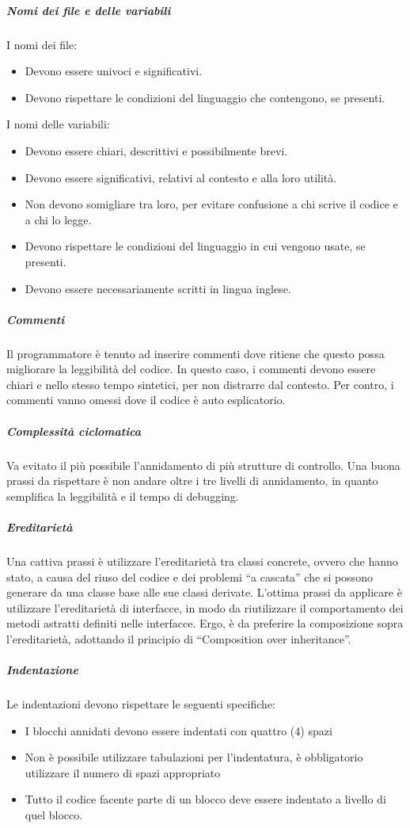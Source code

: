 \documentclass[../../norme-di-progetto.tex]{subfiles}
\begin{document}
\subparagraph{Nomi dei file e delle variabili}%
\label{subp:nomi_file_e_variabili}
I nomi dei file:
\begin{itemize}
    \item Devono essere univoci e significativi.
    \item Devono rispettare le condizioni del linguaggio che contengono, se presenti.
\end{itemize}
I nomi delle variabili:
\begin{itemize}
    \item Devono essere chiari, descrittivi e possibilmente brevi.
    \item Devono essere significativi, relativi al contesto e alla loro utilità.
    \item Non devono somigliare tra loro, per evitare confusione a chi scrive il codice e a chi lo legge.
    \item Devono rispettare le condizioni del linguaggio in cui vengono usate, se presenti.
    \item Devono essere necessariamente scritti in lingua inglese.
\end{itemize}

\subparagraph{Commenti}%
\label{subp:commenti}
Il programmatore è tenuto ad inserire commenti dove ritiene che questo possa migliorare la leggibilità del codice.
In questo caso, i commenti devono essere chiari e nello stesso tempo sintetici, per non distrarre dal contesto.
Per contro, i commenti vanno omessi dove il codice è auto esplicatorio.

\subparagraph{Complessità ciclomatica}%
\label{subp:complessita_ciclomatica}
Va evitato il più possibile l’annidamento di più strutture di controllo.
Una buona prassi da rispettare è non andare oltre i tre livelli di annidamento, in quanto semplifica la leggibilità e il tempo di debugging.

\subparagraph{Ereditarietà}%
\label{subp:ereditarieta}
Una cattiva prassi è utilizzare l’ereditarietà tra classi concrete, ovvero che hanno stato, a causa del riuso del codice e dei problemi ``a cascata'' che si possono generare da una classe base alle sue classi derivate.
L'ottima prassi da applicare è utilizzare l'ereditarietà di interfacce, in modo da riutilizzare il comportamento dei metodi astratti definiti nelle interfacce.
Ergo, è da preferire la composizione sopra l'ereditarietà, adottando il principio di “Composition over inheritance”.

\subparagraph{Indentazione}%
\label{subp:indentazione}
Le indentazioni devono rispettare le seguenti specifiche:
\begin{itemize}
  \item I blocchi annidati devono essere indentati con quattro (4) spazi
  \item Non è possibile utilizzare tabulazioni per l'indentatura, è obbligatorio utilizzare il numero di spazi appropriato
  \item Tutto il codice facente parte di un blocco deve essere indentato a livello di quel blocco.
\end{itemize}
\end{document}
